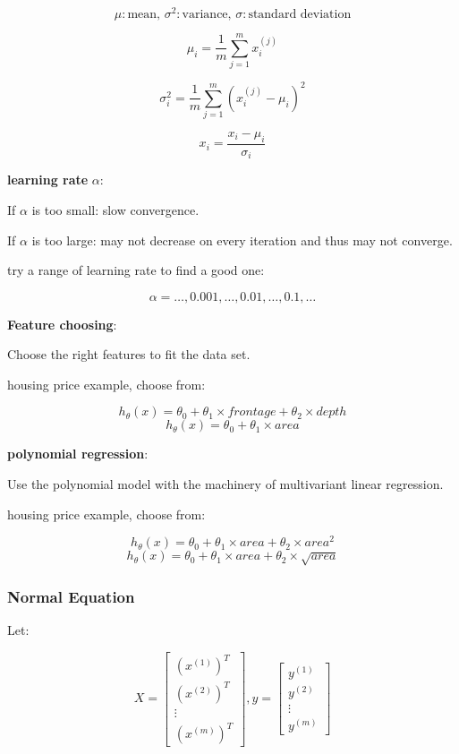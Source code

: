 \documentclass{article}
\begin{document}
\[\mu: \text{mean, } \sigma^2: \text{variance, } \sigma: \text{standard deviation}\]

\[\mu_i ={\frac {1}{m}}\sum _{j=1}^{m}x^{(j)}_{i}\]

\[\sigma^2_i = \frac{1}{m} \sum_{j = 1}^m (x^{(j)}_i - \mu_i)^2\]

\[x_i = \frac{x_i - \mu_i}{\sigma_i}\]

\noindent \textbf{learning rate} \(\alpha\):

\noindent If \(\alpha\) is too small: slow convergence.

\noindent If \(\alpha\) is too large: may not decrease on every iteration and thus may not converge.

\noindent try a range of learning rate to find a good one:

\[\alpha = \dots, 0.001, \dots, 0.01, \dots, 0.1, \dots\]

\noindent \textbf{Feature choosing}:

\noindent Choose the right features to fit the data set.

\noindent housing price example, choose from:

\[h_{\theta}(x) = \theta_0 + \theta_1 \times frontage + \theta_2 \times depth\]
\[h_{\theta}(x) = \theta_0 + \theta_1 \times area\]

\noindent \textbf{polynomial regression}:

\noindent Use the polynomial model with the machinery of multivariant linear regression.

\noindent housing price example, choose from:

\[h_{\theta}(x) = \theta_0 + \theta_1 \times area + \theta_2 \times area^2\]
\[h_{\theta}(x) = \theta_0 + \theta_1 \times area + \theta_2 \times \sqrt{area}\]

\subsubsection{Normal Equation}

\noindent Let:

\[
X = 
\begin{bmatrix}
(x^{(1)})^T\\
(x^{(2)})^T\\
\vdots\\
(x^{(m)})^T
\end{bmatrix}
,
y = 
\begin{bmatrix}
y^{(1)}\\
y^{(2)}\\
\vdots\\
y^{(m)}
\end{bmatrix}
\]
\end{document}
